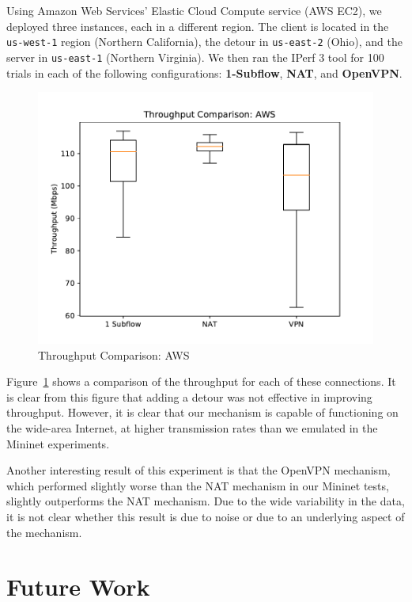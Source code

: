 \documentclass{cwru}
\begin{document}
Using Amazon Web Services' Elastic Cloud Compute service (AWS EC2), we deployed
three instances, each in a different region. The client is located in the
\texttt{us-west-1} region (Northern California), the detour in
\texttt{us-east-2} (Ohio), and the server in \texttt{us-east-1} (Northern
Virginia). We then ran the IPerf 3 tool for 100 trials in each of the following
configurations: \textbf{1-Subflow}, \textbf{NAT}, and \textbf{OpenVPN}.

\begin{figure}
  \centering
  \includegraphics{figures/aws.pdf}
  \caption{Throughput Comparison: AWS}
  \label{fig:aws}
\end{figure}

Figure~\ref{fig:aws} shows a comparison of the throughput for each of these
connections. It is clear from this figure that adding a detour was not effective
in improving throughput. However, it is clear that our mechanism is capable of
functioning on the wide-area Internet, at higher transmission rates than we
emulated in the Mininet experiments.

Another interesting result of this experiment is that the OpenVPN mechanism,
which performed slightly worse than the NAT mechanism in our Mininet tests,
slightly outperforms the NAT mechanism. Due to the wide variability in the data,
it is not clear whether this result is due to noise or due to an underlying
aspect of the mechanism.

\chapter{Future Work}
\label{c:fw}
\end{document}
